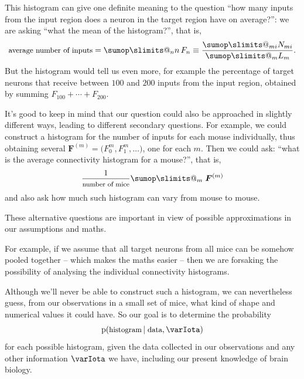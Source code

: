 \documentclass[\ifafour a4paper,12pt,\else a5paper,10pt,\fi%
onecolumn,oneside,article,%
british%
]{memoir}
\makeatletter
\theoremstyle{remark}
\theoremstyle{innote}
\def\sum{\DOTSI\sumop\slimits@}
\newcommand*{\pf}{\mathrm{p}}%
\renewcommand*{\|}[1][]{\nonscript\,#1\vert\nonscript\;\mathopen{}}
\newcommand*{\yI}{\varIota}
\newcommand*{\yN}{N}
\newcommand*{\yF}{\bm{F}}
\makeatother
\begin{document}
This histogram can give one definite meaning to the question \enquote{how
  many inputs from the input region does a neuron in the target region have
  on average?}: we are asking \enquote{what the mean of the histogram?},
that is,
\begin{equation}
  \label{eq:mean_histogram}
  \text{\small average number of inputs} =
  \sum_{n}n\,F_{n} \equiv \frac{\sum_{mi}\yN_{mi}}{\sum_{m}L_{m}}.
\end{equation}
But the histogram would tell us even more, for example the percentage of
target neurons that receive between $100$ and $200$ inputs from the input
region, obtained by summing $F_{100} + \dotsb + F_{200}$.

It's good to keep in mind that our question could also be approached in
slightly different ways, leading to different secondary questions. For
example, we could construct a histogram for the number of inputs for each
mouse individually, thus obtaining several
$\yF^{(m)}=\bigl(F^{{m}}_{0}, F^{{m}}_{1}, \dotsc)$, one for each $m$. Then
we could ask: \enquote{what is the average connectivity histogram for a
  mouse?}, that is,
\begin{equation}
  \label{eq:average_histogram_per_mouse}
  \frac{1}{\text{\footnotesize number of mice}}\sum_{m}\; \yF^{(m)}
\end{equation}
and also ask how much such histogram can vary from mouse to mouse.

\medskip

These alternative questions are important in view of possible
approximations in our assumptions and maths.



For example, if we assume that
all target neurons from all mice can be somehow pooled together -- which
makes the maths easier -- then we are forsaking the possibility of
analysing the individual connectivity histograms.

\medskip

Although we'll never be able to construct such a histogram, we can
nevertheless guess, from our observations in a small set of mice, what kind
of shape and numerical values it could have. So our goal is to determine
the probability
\begin{equation}
  \label{eq:prob_histogram_general}
  \pf(\text{\small histogram} \| \text{\small data}, \yI)
\end{equation}
for each possible histogram, given the data collected in our observations
and any other information $\yI$ we have, including our present knowledge of
brain biology.
\end{document}
